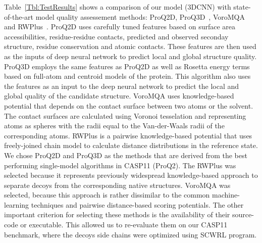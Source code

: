 Table~\ref{Tbl:TestResults} shows a comparison of our model (3DCNN)
with state-of-the-art model quality assessement methods: ProQ2D,
ProQ3D~\cite{uziela2017proq3d}, VoroMQA~\cite{olechnovivc2017voromqa}
and RWPlus~\cite{zhang2010novel}.
ProQ2D uses carefully tuned features based on surface area accessibilities, residue-residue contacts, 
predicted and observed seconday structure, residue conservation and atomic contacts. These features are 
then used as the inputs of deep neural network to predict local and global structure quality. 
ProQ3D employs the same features as ProQ2D as well as Rosetta energy terms based on full-atom and centroid models of the protein. 
This algorithm also uses the features as an input to the deep neural network to predict the 
local and global quality of the candidate structure.
VoroMQA uses knowledge-based potential that depends on the contact surface between two atoms or the solvent. The contact surfaces are calculated 
using Voronoi tesselation and representing atoms as spheres with the radii equal to the Van-der-Waals radii of the corresponding atoms. 
RWPlus is a pairwise knowledge-based potential that uses freely-joined chain model to calculate distance distributions in the reference state.
We chose ProQ2D and ProQ3D as the methods that are derived from the best performing single-model algorithms in CASP11 (ProQ2). The RWPlus 
was selected because it represents previously widespread knowledge-based approach to separate decoys from the corresponding native structures.
VoroMQA was selected, because this approach is rather dissimilar to the common machine-learning techniques and pairwise distance-based scoring potentials.
The other important criterion for selecting these methods is the availability of their source-code or executable. This allowed us to re-evaluate them on 
our CASP11 benchmark, where the decoys side chains were optimized using SCWRL program.




